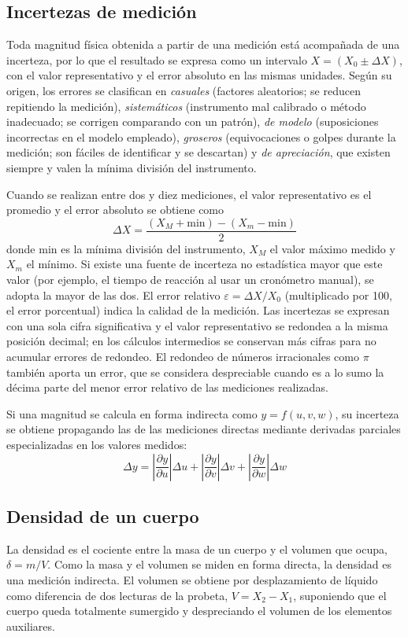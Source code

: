 \documentclass[12pt,a4paper]{article}
\begin{document}
\subsection{Incertezas de medición}
Toda magnitud física obtenida a partir de una medición está acompañada de una incerteza, por
lo que el resultado se expresa como un intervalo $X = (X_0 \pm \Delta X)$, con el valor
representativo y el error absoluto en las mismas unidades. Según su origen, los errores se
clasifican en \emph{casuales} (factores aleatorios; se reducen repitiendo la medición),
\emph{sistemáticos} (instrumento mal calibrado o método inadecuado; se corrigen comparando con
un patrón), \emph{de modelo} (suposiciones incorrectas en el modelo empleado),
\emph{groseros} (equivocaciones o golpes durante la medición; son fáciles de identificar y se
descartan) y \emph{de apreciación}, que existen siempre y valen la mínima división del
instrumento.

Cuando se realizan entre dos y diez mediciones, el valor representativo es el promedio y el
error absoluto se obtiene como
\[
  \Delta X = \frac{(X_M + \mathrm{min}) - (X_m - \mathrm{min})}{2}
\]
donde min es la mínima división del instrumento, $X_M$ el valor máximo medido y $X_m$ el
mínimo. Si existe una fuente de incerteza no estadística mayor que este valor (por ejemplo,
el tiempo de reacción al usar un cronómetro manual), se adopta la mayor de las dos.
El error relativo $\varepsilon = \Delta X / X_0$ (multiplicado por 100, el error
porcentual) indica la calidad de la medición. Las incertezas se expresan con una sola cifra
significativa y el valor representativo se redondea a la misma posición decimal; en los
cálculos intermedios se conservan más cifras para no acumular errores de redondeo. El redondeo de números irracionales como $\pi$ también aporta un error, que se
considera despreciable cuando es a lo sumo la décima parte del menor error relativo de las
mediciones realizadas.

Si una magnitud se calcula en forma indirecta como $y = f(u, v, w)$, su incerteza se obtiene
propagando las de las mediciones directas mediante derivadas parciales especializadas en los
valores medidos:
\[
  \Delta y = \left|\frac{\partial y}{\partial u}\right| \Delta u
           + \left|\frac{\partial y}{\partial v}\right| \Delta v
           + \left|\frac{\partial y}{\partial w}\right| \Delta w
\]

\subsection{Densidad de un cuerpo}
La densidad es el cociente entre la masa de un cuerpo y el volumen que ocupa,
$\delta = m / V$. Como la masa y el volumen se miden en forma directa, la densidad es una
medición indirecta. El volumen se obtiene por desplazamiento de líquido como diferencia de dos
lecturas de la probeta, $V = X_2 - X_1$, suponiendo que el cuerpo queda totalmente sumergido
y despreciando el volumen de los elementos auxiliares.
\end{document}
